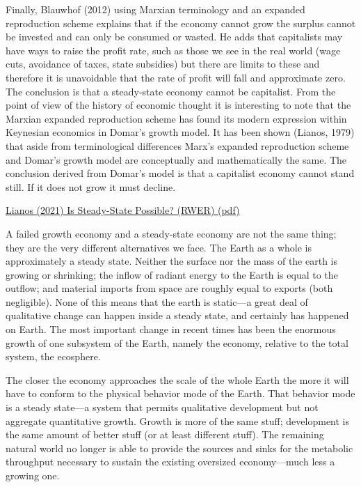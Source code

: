\documentclass[
]{book}
\begin{document}
Finally, Blauwhof (2012) using Marxian terminology and an expanded reproduction scheme
explains that if the economy cannot grow the surplus cannot be invested and can only be
consumed or wasted. He adds that capitalists may have ways to raise the profit rate, such as
those we see in the real world (wage cuts, avoidance of taxes, state subsidies) but there are
limits to these and therefore it is unavoidable that the rate of profit will fall and approximate
zero. The conclusion is that a steady-state economy cannot be capitalist.
From the point of view of the history of economic thought it is interesting to note that the
Marxian expanded reproduction scheme has found its modern expression within Keynesian
economics in Domar's growth model. It has been shown (Lianos, 1979) that aside from
terminological differences Marx's expanded reproduction scheme and Domar's growth model
are conceptually and mathematically the same. The conclusion derived from Domar's model
is that a capitalist economy cannot stand still. If it does not grow it must decline.

\href{pdf/Lianos_2021_Steady-state_possible-RWER95.pdf}{Lianos (2021) Is Steady-State Possible? (RWER) (pdf)}

A failed growth economy and a steady-state economy are not the same thing; they are the very different alternatives
we face. The Earth as a whole is approximately a steady state. Neither the surface nor the mass of the earth is growing
or shrinking; the inflow of radiant energy to the Earth is equal to the outflow; and material imports from space are
roughly equal to exports (both negligible). None of this means that the earth is static---a great deal of qualitative
change can happen inside a steady state, and certainly has happened on Earth. The most important change in recent
times has been the enormous growth of one subsystem of the Earth, namely the economy, relative to the total system,
the ecosphere.

The closer the economy approaches the scale of the whole Earth the more it will have
to conform to the physical behavior mode of the Earth. That behavior mode is a steady state---a system that permits
qualitative development but not aggregate quantitative growth. Growth is more of the same stuff; development is the
same amount of better stuff (or at least different stuff). The remaining natural world no longer is able to provide the
sources and sinks for the metabolic throughput necessary to sustain the existing oversized economy---much less a
growing one.
\end{document}

